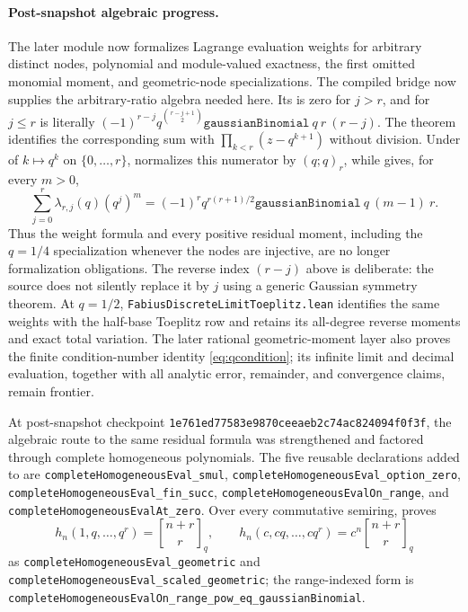 \documentclass[11pt]{article}
\theoremstyle{definition}
\theoremstyle{remark}
\newcommand{\qbinom}[3]{\genfrac{[}{]}{0pt}{}{#1}{#2}_{#3}}
\begin{document}
\paragraph{Post-snapshot algebraic progress.}
The later module  now formalizes Lagrange
evaluation weights for arbitrary distinct nodes, polynomial and module-valued
exactness, the first omitted monomial moment, and geometric-node
specializations.  The compiled bridge
 now supplies the arbitrary-ratio
algebra needed here.  Its  is
zero for \(j>r\), and for \(j\le r\) is literally
\( (-1)^{r-j}q^{\binom{r-j+1}{2}}
\texttt{gaussianBinomial}\ q\ r\ (r-j)\).  The theorem
 identifies the corresponding
sum with \(\prod_{k<r}(z-q^{k+1})\) without division.  Under
 of \(k\mapsto q^k\) on \(\{0,\ldots,r\}\),
 normalizes this
numerator by \((q;q)_r\), while
 gives,
for every \(m>0\),
\[
 \sum_{j=0}^{r}\lambda_{r,j}(q)(q^j)^m
 =(-1)^r q^{r(r+1)/2}
   \texttt{gaussianBinomial}\ q\ (m-1)\ r.
\]
Thus the weight formula and every positive residual moment, including the
\(q=1/4\) specialization whenever the nodes are injective, are no longer
formalization obligations.  The reverse index \((r-j)\) above is deliberate:
the source does not silently replace it by \(j\) using a generic Gaussian
symmetry theorem.  At \(q=1/2\),
\texttt{FabiusDiscreteLimitToeplitz.lean} identifies the same weights with
the half-base Toeplitz row and retains its all-degree reverse moments and
exact total variation.  The later rational geometric-moment layer also proves
the finite condition-number identity \cref{eq:qcondition}; its infinite limit
and decimal evaluation, together with all analytic error, remainder, and
convergence claims, remain frontier.

At post-snapshot checkpoint
\nolinkurl{1e761ed77583e9870ceeaeb2c74ac824094f0f3f}, the algebraic route to the
same residual formula was strengthened and factored through complete
homogeneous polynomials.  The five reusable declarations added to
 are
\nolinkurl{completeHomogeneousEval_smul},
\nolinkurl{completeHomogeneousEval_option_zero},
\nolinkurl{completeHomogeneousEval_fin_succ},
\nolinkurl{completeHomogeneousEvalOn_range}, and
\nolinkurl{completeHomogeneousEvalAt_zero}.  Over every commutative semiring,
 proves
\[
 h_n(1,q,\ldots,q^r)=\qbinom{n+r}{r}{q},
 \qquad
 h_n(c,cq,\ldots,cq^r)=c^n\qbinom{n+r}{r}{q}
\]
as \nolinkurl{completeHomogeneousEval_geometric} and
\nolinkurl{completeHomogeneousEval_scaled_geometric}; the range-indexed form
is
\nolinkurl{completeHomogeneousEvalOn_range_pow_eq_gaussianBinomial}.
\end{document}
